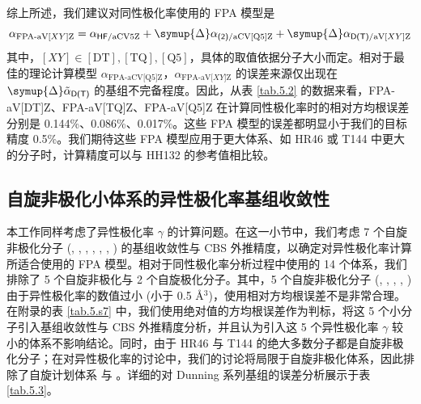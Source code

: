 综上所述，我们建议对同性极化率使用的 FPA 模型是
\begin{equation}
    \label{eq.fpa-alpha}
    \alpha_{\text{FPA-aV[}XY\text{]Z}} = \alpha_{\textsf{HF}/\text{aCV5Z}} + \symup{\Delta} \alpha_{\textsf{(2)}/\text{aCV[Q5]Z}} + \symup{\Delta} \alpha_{\textsf{D(T)}/\text{aV[}XY\text{]Z}}
\end{equation}
其中，$[XY] \in \mathrm{[DT], [TQ], [Q5]}$，具体的取值依据分子大小而定。相对于最佳的理论计算模型 $\alpha_{\text{FPA-aCV[Q5]Z}}$，$\alpha_{\text{FPA-aV[}XY\text{]Z}}$ 的误差来源仅出现在 $\symup{\Delta} \tilde \alpha_\textsf{D(T)}$ 的基组不完备程度。因此，从表 \ref{tab.5.2} 的数据来看，FPA-aV[DT]Z、FPA-aV[TQ]Z、FPA-aV[Q5]Z 在计算同性极化率时的相对方均根误差分别是 0.144\%、0.086\%、0.017\%。这些 FPA 模型的误差都明显小于我们的目标精度 0.5\%。我们期待这些 FPA 模型应用于更大体系、如 HR46 或 T144 中更大的分子时，计算精度可以与 HH132 的参考值相比较。

\subsection{自旋非极化小体系的异性极化率基组收敛性}

本工作同样考虑了异性极化率 $\gamma$ 的计算问题。在这一小节中，我们考虑 7 个自旋非极化分子 (, , , , , , ) 的基组收敛性与 CBS 外推精度，以确定对异性极化率计算所适合使用的 FPA 模型。相对于同性极化率分析过程中使用的 14 个体系，我们排除了 5 个自旋非极化与 2 个自旋极化分子。其中，5 个自旋非极化分子 (, , , , ) 由于异性极化率的数值过小 (小于 0.5 $\text{\AA}{}^3$)，使用相对方均根误差不是非常合理。在附录的表 \ref{tab.5.s7} 中，我们使用绝对值的方均根误差作为判标，将这 5 个小分子引入基组收敛性与 CBS 外推精度分析，并且认为引入这 5 个异性极化率 $\gamma$ 较小的体系不影响结论。同时，由于 HR46 与 T144 的绝大多数分子都是自旋非极化分子；在对异性极化率的讨论中，我们的讨论将局限于自旋非极化体系，因此排除了自旋计划体系  与 。详细的对 Dunning 系列基组的误差分析展示于表 \ref{tab.5.3}。

